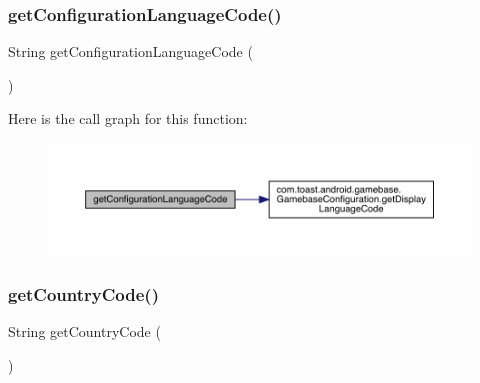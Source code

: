 \subsubsection{\texorpdfstring{get\+Configuration\+Language\+Code()}{getConfigurationLanguageCode()}}
{\footnotesize\ttfamily String get\+Configuration\+Language\+Code (\begin{DoxyParamCaption}{ }\end{DoxyParamCaption})}

Here is the call graph for this function\+:
\nopagebreak
\begin{figure}[H]
\begin{center}
\leavevmode
\includegraphics[width=350pt]{classcom_1_1toast_1_1android_1_1gamebase_1_1_gamebase_system_info_a026dd56348bf7dca330cbbc8d79e5d83_cgraph}
\end{center}
\end{figure}
\mbox{\label{classcom_1_1toast_1_1android_1_1gamebase_1_1_gamebase_system_info_a561de249511c5e6d25b6b563eb95b80a}} 
\subsubsection{\texorpdfstring{get\+Country\+Code()}{getCountryCode()}}
{\footnotesize\ttfamily String get\+Country\+Code (\begin{DoxyParamCaption}{ }\end{DoxyParamCaption})}

